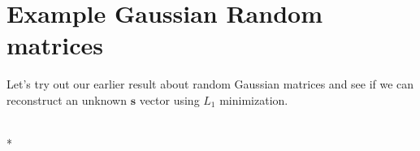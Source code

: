 \documentclass[letterpaper,10pt,english]{/usr/lib/python2.7/site-packages/sphinx/texinputs/sphinxhowto}
\def\smaller{\fontsize{9.5pt}{9.5pt}\selectfont}
\begin{document}
        
    
\section{Example Gaussian Random matrices
}Let's try out our earlier result about random Gaussian matrices and see
if we can reconstruct an unknown $\mathbf{s}$ vector using $L_1$
minimization.



    
        \vspace{6pt}
        \makebox[0.1\linewidth]{\smaller\hfill\tt\color{nbframe-in-prompt}In\hspace{4pt}{[}56{]}:\hspace{4pt}}\\*
        \vspace{-2.65\baselineskip}
\end{document}

